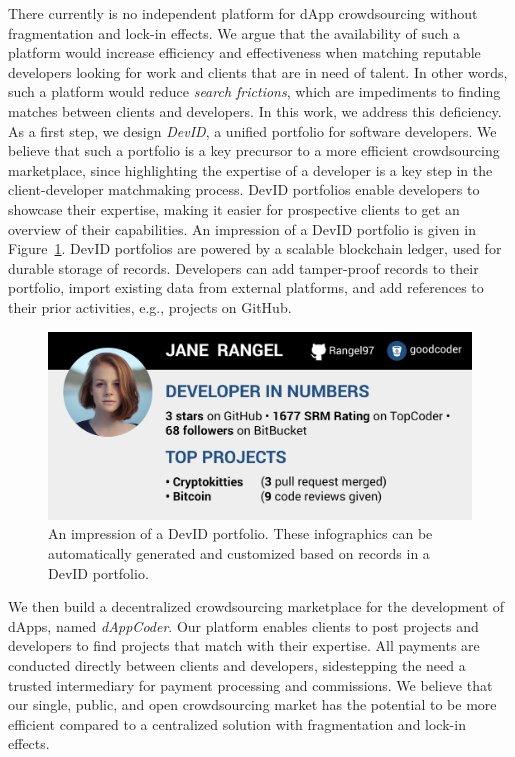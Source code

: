 There currently is no independent platform for dApp crowdsourcing without fragmentation and lock-in effects.
We argue that the availability of such a platform would increase efficiency and effectiveness when matching reputable developers looking for work and clients that are in need of talent.
In other words, such a platform would reduce \emph{search frictions}, which are impediments to finding matches between clients and developers.
In this work, we address this deficiency.
As a first step, we design \emph{DevID}, a unified portfolio for software developers.
We believe that such a portfolio is a key precursor to a more efficient crowdsourcing marketplace, since highlighting the expertise of a developer is a key step in the client-developer matchmaking process.
DevID portfolios enable developers to showcase their expertise, making it easier for prospective clients to get an overview of their capabilities.
An impression of a DevID portfolio is given in Figure~\ref{fig:devid}.
DevID portfolios are powered by a scalable blockchain ledger, used for durable storage of records.
Developers can add tamper-proof records to their portfolio, import existing data from external platforms, and add references to their prior activities, e.g., projects on GitHub.

\begin{figure}[t]
	\includegraphics[width=\columnwidth]{devid/resources/devid_smaller.jpeg}
	\caption{An impression of a DevID portfolio. These infographics can be automatically generated and customized based on records in a DevID portfolio.}
	\label{fig:devid}
\end{figure}

We then build a decentralized crowdsourcing marketplace for the development of dApps, named \emph{dAppCoder}.
Our platform enables clients to post projects and developers to find projects that match with their expertise.
All payments are conducted directly between clients and developers, sidestepping the need a trusted intermediary for payment processing and commissions.
We believe that our single, public, and open crowdsourcing market has the potential to be more efficient compared to a centralized solution with fragmentation and lock-in effects.

